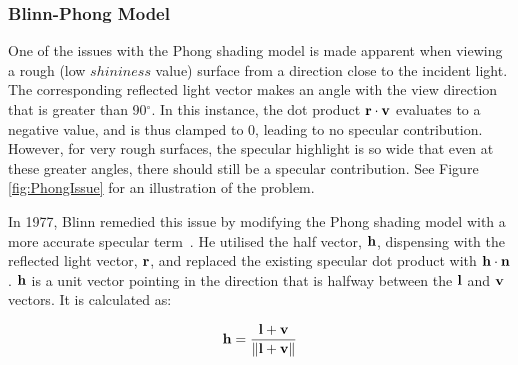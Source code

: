 \vspace{-0.6cm}

\subsubsection{Blinn-Phong Model}

One of the issues with the Phong shading model is made apparent when viewing a rough (low \begin{math}shininess\end{math} value) surface from a direction close to the incident light. The corresponding reflected light vector makes an angle with the view direction that is greater than 90$^{\circ}$. In this instance, the dot product \begin{math}\mathbf{r}\cdot\mathbf{v}\end{math} evaluates to a negative value, and is thus clamped to 0, leading to no specular contribution. However, for very rough surfaces, the specular highlight is so wide that even at these greater angles, there should still be a specular contribution. See Figure \ref{fig:PhongIssue} for an illustration of the problem.

In 1977, Blinn remedied this issue by modifying the Phong shading model with a more accurate specular term~\cite{BlinnModelsOfLightReflection}. He utilised the half vector, \begin{math}\mathbf{h}\end{math}, dispensing with the reflected light vector, \begin{math}\mathbf{r}\end{math}, and replaced the existing specular dot product with \begin{math}\mathbf{h}\cdot\mathbf{n}\end{math}. \begin{math}\mathbf{h}\end{math} is a unit vector pointing in the direction that is halfway between the \begin{math}\mathbf{l}\end{math} and \begin{math}\mathbf{v}\end{math} vectors. It is calculated as:

\begin{equation}
	\mathbf{h} = \frac{\mathbf{l} + \mathbf{v}}{\norm{\mathbf{l} + \mathbf{v}}}
\end{equation}

